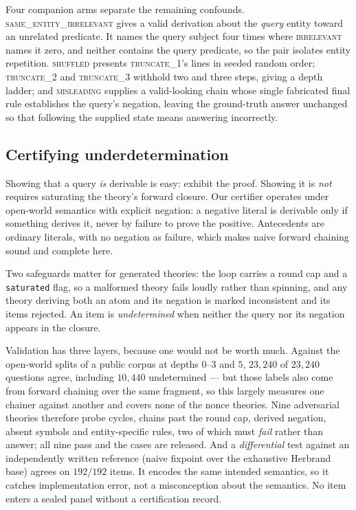 \documentclass[10pt,twocolumn]{article}
\begin{document}
Four companion arms separate the remaining confounds.
\textsc{same\_entity\_irrelevant} gives a valid derivation about the \emph{query}
entity toward an unrelated predicate. It names the query subject four times where \textsc{irrelevant} names it zero, and neither contains the query predicate, so the pair isolates entity repetition. \textsc{shuffled} presents
\textsc{truncate\_1}'s lines in seeded random order; \textsc{truncate\_2} and
\textsc{truncate\_3} withhold two and three steps, giving a depth ladder; and
\textsc{misleading} supplies a valid-looking chain whose single fabricated final
rule establishes the query's negation, leaving the ground-truth answer unchanged
so that following the supplied state means answering incorrectly.

\subsection{Certifying underdetermination}
\label{sec:closure}

Showing that a query \emph{is} derivable is easy: exhibit the proof. Showing it
is \emph{not} requires saturating the theory's forward closure. Our certifier operates under open-world semantics with explicit negation: a
negative literal is derivable only if something derives it, never by failure to
prove the positive. Antecedents are ordinary literals, with no negation as
failure, which makes naive forward chaining sound and complete here.

Two safeguards matter for generated theories: the loop carries a round cap and a
\texttt{saturated} flag, so a malformed theory fails loudly rather than spinning,
and any theory deriving both an atom and its negation is marked inconsistent and
its items rejected. An
item is \emph{undetermined} when neither the query nor its negation appears in
the closure.

Validation has three layers, because one would not be worth much. Against the
open-world splits of a public corpus \citep{tafjord2020proofwriter} at depths
$0$--$3$ and $5$, $23{,}240$ of $23{,}240$ questions agree, including $10{,}440$
undetermined --- but those labels also come from forward chaining over the same
fragment, so this largely measures one chainer against another and covers none of
the nonce theories. Nine adversarial theories therefore probe cycles, chains past
the round cap, derived negation, absent symbols and entity-specific rules, two of
which must \emph{fail} rather than answer; all nine pass and the cases are
released. And a \emph{differential} test against an independently written reference (naive
fixpoint over the exhaustive Herbrand base) agrees on $192/192$ items. It encodes
the same intended semantics, so it catches implementation error, not a
misconception about the semantics. No item enters a sealed panel
without a certification record.
\end{document}
